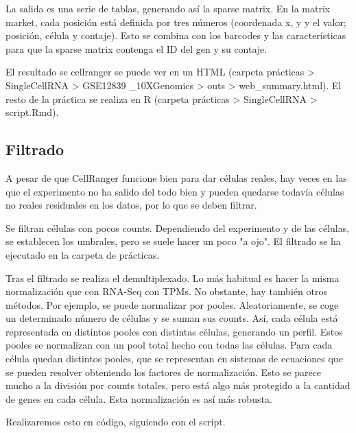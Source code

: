 La salida es una serie de tablas, generando así la sparse matrix. En la matrix market, cada posición está definida por tres números (coordenada x, y y el valor; posición, célula y contaje). Esto se combina con los barcodes y las características para que la sparse matrix contenga el ID del gen y su contaje. 

El resultado se cellranger se puede ver en un HTML (carpeta prácticas > SingleCellRNA > GSE12839 \_10XGenomics > outs > web\_summary.html). El resto de la práctica se realiza en R (carpeta prácticas > SingleCellRNA > script.Rmd).

\subsection{Filtrado}
A pesar de que CellRanger funcione bien para dar células reales, hay veces en las que el experimento no ha salido del todo bien y pueden quedarse todavía células no reales residuales en los datos, por lo que se deben filtrar. 

Se filtran células con pocos counts. Dependiendo del experimento y de las células, se establecen los umbrales, pero se suele hacer un poco "a ojo". El filtrado se ha ejecutado en la carpeta de prácticas.

Tras el filtrado se realiza el demultiplexado. Lo más habitual es hacer la misma normalización que con RNA-Seq con TPMs. No obstante, hay también otros métodos. Por ejemplo, se puede normalizar por pooles. Aleatoriamente, se coge un determinado número de células y se suman sus counts. Así, cada célula está representada en distintos pooles con distintas células, generando un perfil. Estos pooles se normalizan con un pool total hecho con todas las células. Para cada célula quedan distintos pooles, que se representan en sistemas de ecuaciones que se pueden resolver obteniendo los factores de normalización. Esto se parece mucho a la división por counts totales, pero está algo más protegido a la cantidad de genes en cada célula. Esta normalización es así más robusta. 

Realizaremos esto en código, siguiendo con el script. 




